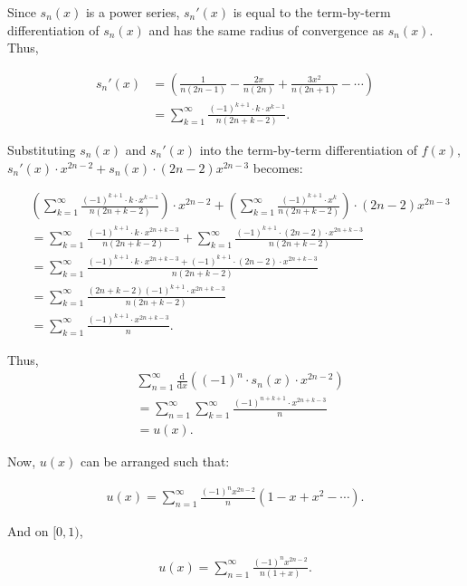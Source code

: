 \documentclass{article}
\begin{document}
Since $s_n(x)$ is a power series, $s_n'(x)$ is equal to the term-by-term differentiation of $s_n(x)$ and has the same radius of convergence as $s_n(x)$. Thus, 

\begin{align*}
s_n'(x) &= \left(\frac{1}{n(2n-1)}-\frac{2x}{n(2n)}+\frac{3x^2}{n(2n+1)}-\cdots\right) \\ &= \sum_{k=1}^{\infty}\frac{(-1)^{k+1}\cdot k \cdot x^{k-1}}{n(2n+k-2)}.
\end{align*}

Substituting $s_n(x)$ and $s_n'(x)$ into the term-by-term differentiation of $f(x)$, $s_n'(x) \cdot x^{2n-2} + s_n(x) \cdot (2n-2)x^{2n-3}$ becomes:

\begin{align*}
&\left(\sum_{k=1}^{\infty}\frac{(-1)^{k+1}\cdot k \cdot x^{k-1}}{n(2n+k-2)}\right) \cdot x^{2n-2} + \left(\sum_{k=1}^{\infty}\frac{(-1)^{k+1}\cdot x^{k}}{n(2n+k-2)}\right) \cdot (2n-2)x^{2n-3} \\
&= \sum_{k=1}^{\infty}\frac{(-1)^{k+1}\cdot k \cdot x^{2n+k-3}}{n(2n+k-2)} + \sum_{k=1}^{\infty}\frac{(-1)^{k+1}\cdot (2n-2) \cdot x^{2n+k-3}}{n(2n+k-2)} \\
&= \sum_{k=1}^{\infty}\frac{(-1)^{k+1}\cdot k \cdot x^{2n+k-3} +(-1)^{k+1}\cdot (2n-2) \cdot x^{2n+k-3}}{n(2n+k-2)} \\
&= \sum_{k=1}^{\infty}\frac{(2n+k-2)(-1)^{k+1} \cdot x^{2n+k-3}}{n(2n+k-2)} \\
&= \sum_{k=1}^{\infty}\frac{ (-1)^{k+1}\cdot x^{2n+k-3}}{n}.
\end{align*}

Thus, 
\begin{align*}
    &\sum_{n=1}^{\infty}\frac{\mathrm{d}}{\mathrm{d}x}\left((-1)^n\cdot s_n(x)\cdot x^{2n-2}\right) \\
    &= \sum_{n=1}^{\infty}\sum_{k=1}^{\infty}\frac{ (-1)^{n+k+1}\cdot x^{2n+k-3}}{n} \\
    &= u(x).
\end{align*}

Now, $u(x)$ can be arranged such that:

\begin{align*}
    u(x) =\sum_{n=1}^{\infty} \frac{(-1)^nx^{2n-2}}{n}(1-x+x^2-\cdots).
\end{align*}

And on $[0, 1)$,

\begin{align*}
    u(x) =\sum_{n=1}^{\infty} \frac{(-1)^nx^{2n-2}}{n(1+x)}.
\end{align*}
\end{document}
